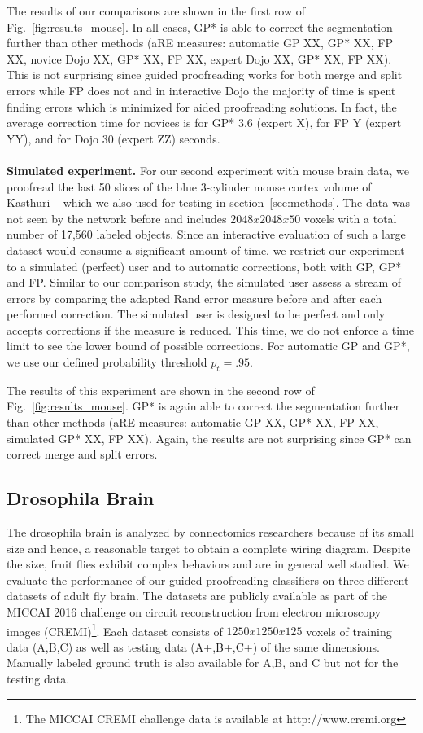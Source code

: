 The results of our comparisons are shown in the first row of Fig.~\ref{fig:results_mouse}. In all cases, GP* is able to correct the segmentation further than other methods (aRE measures: automatic GP XX, GP* XX, FP XX, novice Dojo XX, GP* XX, FP XX, expert Dojo XX, GP* XX, FP XX). This is not surprising since guided proofreading works for both merge and split errors while FP does not and in interactive Dojo the majority of time is spent finding errors which is minimized for aided proofreading solutions. In fact, the average correction time for novices is for GP* 3.6 (expert X), for FP Y (expert YY), and for Dojo 30 (expert ZZ) seconds.
\\~\\
\textbf{Simulated experiment.} For our second experiment with mouse brain data, we proofread the last 50 slices of the blue 3-cylinder mouse cortex volume of Kasthuri \etal~\cite{kasthuri2015saturated} which we also used for testing in section~\ref{sec:methods}. The data was not seen by the network before and includes $2048x2048x50$ voxels with a total number of 17,560 labeled objects. Since an interactive evaluation of such a large dataset would consume a significant amount of time, we restrict our experiment to a simulated (perfect) user and to automatic corrections, both with GP, GP* and FP. Similar to our comparison study, the simulated user assess a stream of errors by comparing the adapted Rand error measure before and after each performed correction. The simulated user is designed to be perfect and only accepts corrections if the measure is reduced. This time, we do not enforce a time limit to see the lower bound of possible corrections. For automatic GP and GP*, we use our defined probability threshold $p_t=.95$.

The results of this experiment are shown in the second row of Fig.~\ref{fig:results_mouse}. GP* is again able to correct the segmentation further than other methods (aRE measures: automatic GP XX, GP* XX, FP XX, simulated GP* XX, FP XX). Again, the results are not surprising since GP* can correct merge and split errors.

\subsection{Drosophila Brain}

The drosophila brain is analyzed by connectomics researchers because of its small size and hence, a reasonable target to obtain a complete wiring diagram. Despite the size, fruit flies exhibit complex behaviors and are in general well studied. We evaluate the performance of our guided proofreading classifiers on three different datasets of adult fly brain. The datasets are publicly available as part of the MICCAI 2016 challenge on circuit reconstruction from electron microscopy images (CREMI)\footnote{The MICCAI CREMI challenge data is available at  http://www.cremi.org}. Each dataset consists of $1250x1250x125$ voxels of training data (A,B,C) as well as testing data (A+,B+,C+) of the same dimensions. Manually labeled ground truth is also available for A,B, and C but not for the testing data.

